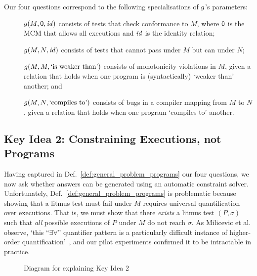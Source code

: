 Our four questions correspond to the following specialisations of
$g$'s parameters:
%
\begin{description}
%
\item[] $g(M,\textsf{0},\mathit{id})$ consists of tests that check conformance to $M$, where $\textsf{0}$ is the MCM
that allows all executions and $\mathit{id}$ is the identity relation;
%
\item[] $g(M,N,\mathit{id})$ consists of tests that cannot pass
under $M$ but can under $N$;
%
\item[] $g(M,M,\text{`is weaker than'})$ consists of
monotonicity violations in $M$, given a relation that holds when one
program is (syntactically) `weaker than' another; and
%
\item[] $g(M,N,\text{`compiles to'})$ consists of bugs
in a compiler mapping from $M$ to $N$, given a relation that holds when one program `compiles to' another.
%
\end{description}

\subsection{Key Idea 2: Constraining Executions, not Programs} 
\label{sec:intro:constraining_execs}

Having captured in Def.~\ref{def:general_problem_programs} our four
questions, we now ask whether answers can be generated using an
automatic constraint solver. Unfortunately,
Def.~\ref{def:general_problem_programs} is problematic because showing
that a litmus test must fail under $M$ requires universal
quantification over executions. That is, we must show that there
\emph{exists} a litmus test $(P,\sigma)$ such that \emph{all} possible
executions of $P$ under $M$ do not reach $\sigma$. As Milicevic et al.
observe, `this ``$\exists\forall$'' quantifier pattern is a
particularly difficult instance of higher-order
quantification'~\cite{milicevic+15}, and our pilot experiments
confirmed it to be intractable in practice.

\begin{figure}[t]
\centering
{}\hspace*{1cm}
\caption{Diagram for explaining Key Idea 2}
\label{fig:keyidea2}
\end{figure}

